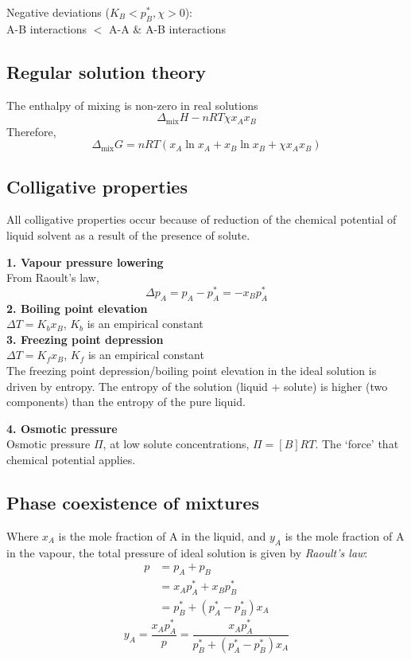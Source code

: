 Negative deviations ($K_B < p^*_B, \chi > 0$): \\
A-B interactions $<$ A-A \& A-B interactions

\subsection*{Regular solution theory}
The enthalpy of mixing is non-zero in real solutions
\begin{equation*}
    \Delta_{\textrm{mix}}H - nRT \chi x_A x_B
\end{equation*}
Therefore,
\begin{equation*}
    \Delta_{\textrm{mix}}G = nRT(x_A \ln x_A + x_B \ln x_B + \chi x_A x_B)
\end{equation*}

\subsection*{Colligative properties}
All colligative properties occur because of reduction of the chemical potential of liquid solvent as a result of the presence of solute.

\textbf{1. Vapour pressure lowering} \\
From Raoult's law,
\begin{equation*}
    \Delta p_A = p_A - p^{*}_{A} = -x_B p^*_A
\end{equation*}
\textbf{2. Boiling point elevation} \\
$\Delta T = K_b x_B$, $K_b$ is an empirical constant \\
\textbf{3. Freezing point depression} \\
$\Delta T = K_f x_B$, $K_f$ is an empirical constant \\
The freezing point depression/boiling point elevation in the ideal solution is driven by entropy. The entropy of the solution (liquid + solute) is higher (two components) than the entropy of the pure liquid.

\textbf{4. Osmotic pressure} \\
Osmotic pressure $\Pi$, at low solute concentrations,
$\Pi = [B]RT$. The `force' that chemical potential applies.

\subsection*{Phase coexistence of mixtures}
Where $x_A$ is the mole fraction of A in the liquid, and $y_A$ is the mole fraction of A in the vapour, the total pressure of ideal solution is given by \textit{Raoult's law}:
\begin{equation*}
    \begin{aligned}
        p & = p_A + p_B \\
        &= x_Ap_A^* + x_B p_B^* \\
        &= p^*_B + (p_A^* - p_B^*)x_A
    \end{aligned}
\end{equation*}
\begin{equation*}
    y_A = \frac{x_Ap_A^*}{p} = \frac{x_Ap_A^*}{p^*_B + (p_A^* - p_B^*)x_A}
\end{equation*}

